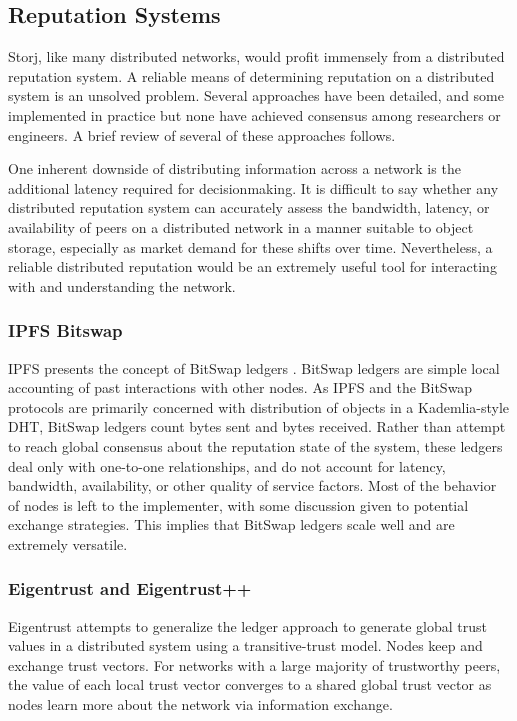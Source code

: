 \documentclass[a4paper,10pt]{article}
\begin{document}
\subsection{Reputation Systems}
Storj, like many distributed networks, would profit immensely from a distributed reputation system. A reliable means of determining reputation on a distributed system is an unsolved problem. Several approaches have been detailed, and some implemented in practice but none have achieved consensus among researchers or engineers. A brief review of several of these approaches follows.

One inherent downside of distributing information across a network is the additional latency required for decisionmaking. It is difficult to say whether any distributed reputation system can accurately assess the bandwidth, latency, or availability of peers on a distributed network in a manner suitable to object storage, especially as market demand for these shifts over time. Nevertheless, a reliable distributed reputation would be an extremely useful tool for interacting with and understanding the network.

\subsubsection{IPFS Bitswap}
IPFS presents the concept of BitSwap ledgers \cite{18}. BitSwap ledgers are simple local accounting of past interactions with other nodes. As IPFS and the BitSwap protocols are primarily concerned with distribution of objects in a Kademlia-style DHT, BitSwap ledgers count bytes sent and bytes received. Rather than attempt to reach global consensus about the reputation state of the system, these ledgers deal only with one-to-one relationships, and do not account for latency, bandwidth, availability, or other quality of service factors. Most of the behavior of nodes is left to the implementer, with some discussion given to potential exchange strategies. This implies that BitSwap ledgers scale well and are extremely versatile.

\subsubsection{Eigentrust and Eigentrust++}
Eigentrust \cite{19} attempts to generalize the ledger approach to generate global trust values in a distributed system using a transitive-trust model. Nodes keep and exchange trust vectors. For networks with a large majority of trustworthy peers, the value of each local trust vector converges to a shared global trust vector as nodes learn more about the network via information exchange.
\end{document}
